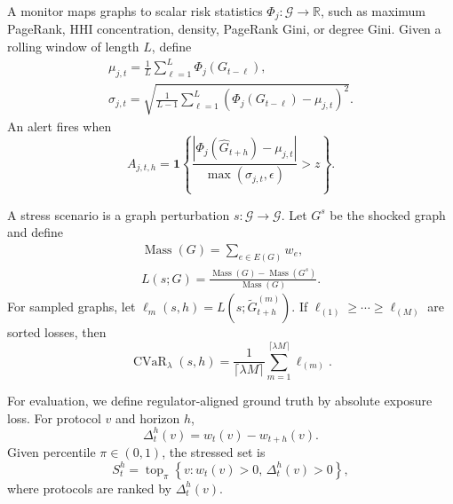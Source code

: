A monitor maps graphs to scalar risk statistics $\Phi_j:\mathcal{G}\to\mathbb{R}$, such as maximum PageRank, HHI concentration, density, PageRank Gini, or degree Gini. Given a rolling window of length $L$, define
\begin{gather*}
\mu_{j,t}
=
\frac{1}{L}
\sum_{\ell=1}^{L}
\Phi_j(G_{t-\ell}),\\
\sigma_{j,t}
=
\sqrt{
\frac{1}{L-1}
\sum_{\ell=1}^{L}
\left(\Phi_j(G_{t-\ell})-\mu_{j,t}\right)^2
}.
\end{gather*}
An alert fires when
\begin{equation}
A_{j,t,h}
=
\mathbf{1}
\left\{
\frac{
\left|\Phi_j(\widehat{G}_{t+h})-\mu_{j,t}\right|
}{
\max(\sigma_{j,t},\epsilon)
}
>z
\right\}.
\end{equation}

A stress scenario is a graph perturbation $s:\mathcal{G}\to\mathcal{G}$. Let $G^s$ be the shocked graph and define
\begin{gather*}
\operatorname{Mass}(G)=\sum_{e\in E(G)}w_e,\\
L(s;G)
=
\frac{
\operatorname{Mass}(G)-\operatorname{Mass}(G^s)
}{
\operatorname{Mass}(G)
}.
\end{gather*}
For sampled graphs, let $\ell_m(s,h)=L(s;\widetilde{G}_{t+h}^{(m)})$. If $\ell_{(1)}\geq\cdots\geq\ell_{(M)}$ are sorted losses, then
\begin{equation}
\operatorname{CVaR}_{\lambda}(s,h)
=
\frac{1}{\lceil\lambda M\rceil}
\sum_{m=1}^{\lceil\lambda M\rceil}
\ell_{(m)}.
\end{equation}

For evaluation, we define regulator-aligned ground truth by absolute exposure loss. For protocol $v$ and horizon $h$,
\begin{equation}
\Delta_t^h(v)=w_t(v)-w_{t+h}(v).
\end{equation}
Given percentile $\pi\in(0,1)$, the stressed set is
\begin{equation}
S_t^h
=
\operatorname{top}_{\pi}
\left\{
v:
w_t(v)>0,\,
\Delta_t^h(v)>0
\right\},
\end{equation}
where protocols are ranked by $\Delta_t^h(v)$.


